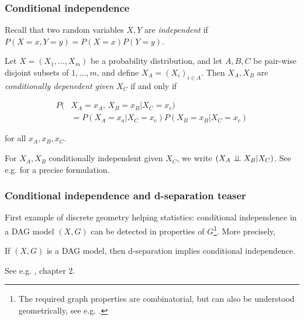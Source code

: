 \begin{frame}
\frametitle{Conditional independence}

Recall that two random variables $X, Y$ are \emph{independent} if $P(X=x, Y=y) = P(X=x) P(Y=y)$.

\begin{definition}
Let $X = (X_1, \ldots, X_m)$ be a probability distribution, and let $A, B, C$ be pair-wise disjoint subsets of ${1, \ldots, m}$, and define $X_A = (X_i)_{i \in A}$. Then $X_A, X_B$ are \emph{conditionally depenedent given $X_C$} if and only if 

\begin{align*}
P(&X_A = x_A,  \,X_B = x_B | X_C = x_c) \\
&= P(X_A = x_a | X_C = x_c) P(X_B = x_B | X_C = x_c)
\end{align*}

for all $x_A, x_B, x_C$.\newline
\end{definition}

For $X_A, X_B$ conditionally independent given $X_C$, we write $(X_A \perp\!\!\!\perp X_B | X_C)$. See e.g. \cite{drton2008lectures} for a precise formulation.
\end{frame}

\begin{frame}
\frametitle{Conditional independence and d-separation teaser}
First example of discrete geometry helping statistics: conditional independence in a DAG model $(X, G)$ can be detected in properties of $G$\footnote{The required graph properties are combinatorial, but can also be understood geometrically, see e.g. \cite{drton2008lectures}.}. More precisely,


\begin{theorem}
If $(X, G)$ is a DAG model, then d-separation implies conditional independence.
\end{theorem}
See e.g. \cite{pearl2016causal}, chapter 2.
\end{frame}


